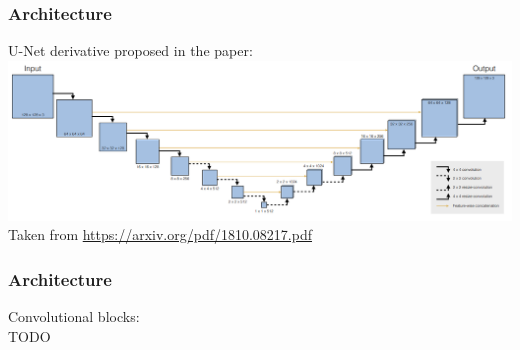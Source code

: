 \begin{frame}
    \frametitle{Architecture}

U-Net derivative proposed in the paper: \\[\baselineskip]

\includegraphics[width=\textwidth, height=.55\textheight]{./Ressourcen/Praesentation/Bilder/architecture.png}%
\newline
Taken from \url{https://arxiv.org/pdf/1810.08217.pdf}
\end{frame}
\clearpage

\begin{frame}
    \frametitle{Architecture}

Convolutional blocks: \\[\baselineskip]
TODO

\end{frame}
\clearpage